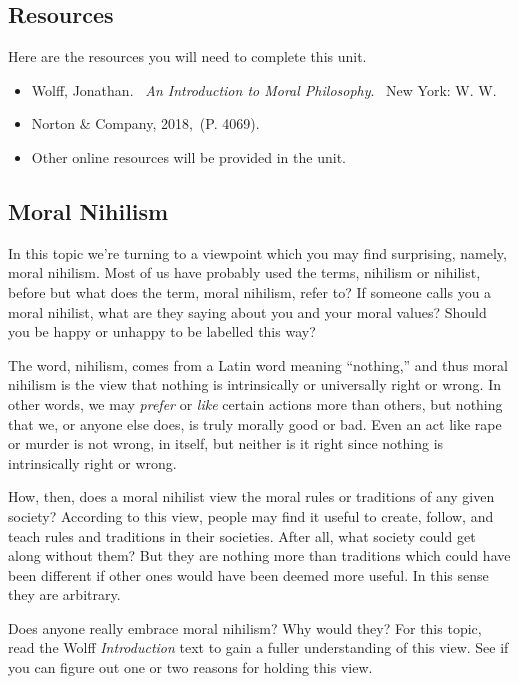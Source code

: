 \documentclass[
]{book}
\providecommand{\tightlist}{%
  \setlength{\itemsep}{0pt}\setlength{\parskip}{0pt}}
\begin{document}
\hypertarget{resources-1}{%
\subsection*{Resources}\label{resources-1}}

Here are the resources you will need to complete this unit.

\begin{itemize}
\tightlist
\item
  Wolff, Jonathan. ~\emph{An Introduction to Moral Philosophy}. ~New York: W. W.
\item
  Norton \& Company, 2018,~(P. 4069).
\item
  Other online resources will be provided in the unit.
\end{itemize}

\hypertarget{moral-nihilism}{%
\subsection*{Moral Nihilism}\label{moral-nihilism}}

In this topic we're turning to a viewpoint which you may find surprising,
namely, moral nihilism. Most of us have probably used the terms, nihilism or nihilist, before but what does the term, moral nihilism, refer to? If someone calls you a moral nihilist, what are they saying about you and your moral
values? Should you be happy or unhappy to be labelled this way?

The word, nihilism, comes from a Latin word meaning ``nothing,'' and thus moral nihilism is the view that nothing is intrinsically or universally right or wrong. In other words, we may \emph{prefer} or \emph{like} certain actions more than others, but nothing that we, or anyone else does, is truly morally good or bad. Even an act like rape or murder is not wrong, in itself, but neither is it right since nothing is intrinsically right or wrong.

How, then, does a moral nihilist view the moral rules or traditions of any given society? According to this view, people may find it useful to create, follow, and teach rules and traditions in their societies. After all, what society could get along without them? But they are nothing more than traditions which could have been different if other ones would have been deemed more useful. In this sense they are arbitrary.

Does anyone really embrace moral nihilism? Why would they? For this topic, read the Wolff \emph{Introduction} text to gain a fuller understanding of this view. See if you can figure out one or two reasons for holding this view.
\end{document}
